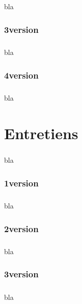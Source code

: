 \paragraph{}
bla

\subsection{3\ieme version}
\paragraph{}
bla

\subsection{4\ieme version}
\paragraph{}
bla

\chapter{Entretiens}
\paragraph{}
bla

\subsection{1\ier version}
\paragraph{}
bla

\subsection{2\ieme version}
\paragraph{}
bla

\subsection{3\ieme version}
\paragraph{}
bla


